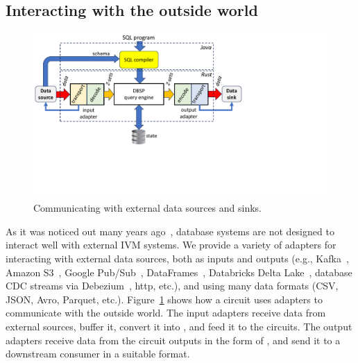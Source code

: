 \subsection{Interacting with the outside world}

\begin{figure}[h]
  \begin{center}
  \includegraphics[trim={0 2.2inin 3.7in 0},clip,scale=.33]{adapters.pdf}
  \caption{\label{fig:adapters}Communicating with external data
    sources and sinks.}
  \end{center}
\end{figure}

As it was noticed out many years ago~\cite{labio-vldb00}, database
systems are not designed to interact well with external IVM systems.
We provide a variety of adapters for interacting with external data
sources, both as inputs and outputs (e.g., Kafka~\cite{kreps-netdb11},
Amazon S3~\cite{palankar-dadc08}, Google Pub/Sub~\cite{pubsub},
DataFrames~\cite{pandas12}, Databricks Delta
Lake~\cite{armbrust-vldb20}, database CDC streams via
Debezium~\cite{debezium}, http, etc.), and using many data formats
(CSV, JSON, Avro, Parquet, etc.).  Figure~\ref{fig:adapters} shows how
a circuit uses adapters to communicate with the outside world.  The
input adapters receive data from external sources, buffer it, convert
it into \zrs, and feed it to the circuits.  The output adapters
receive data from the circuit outputs in the form of \zrs, and send it
to a downstream consumer in a suitable format.

